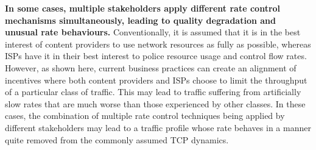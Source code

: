 \textbf{In some cases, multiple stakeholders apply different rate control mechanisms simultaneously, leading to quality degradation and unusual rate behaviours.}
Conventionally, it is assumed that it is in the best interest of content providers to use network resources as fully as possible, whereas \acp{ISP} have it in their best interest to police resource usage and control flow rates. 
However, as shown here, current business practices can create an alignment of incentives where both content providers and \acp{ISP} choose to limit the throughput of a particular class of traffic. 
This may lead to traffic suffering from artificially slow rates that are much worse than those experienced by other classes. 
In these cases, the combination of multiple rate control techniques being applied by different stakeholders may lead to a traffic profile whose rate behaves in a manner quite removed from the commonly assumed \ac{TCP} dynamics.

